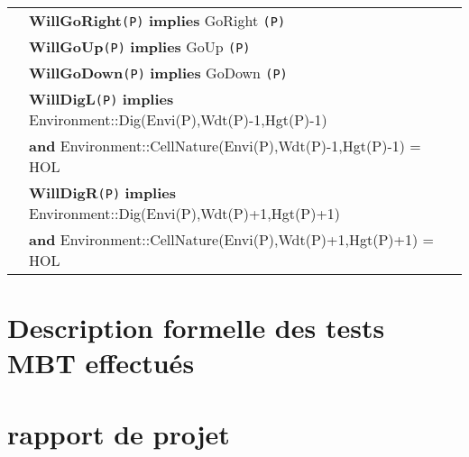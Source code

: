 \documentclass{article}
\begin{document}
\begin{tabular}{rl}
& \textbf{WillGoRight}\texttt{(P)}  \textbf{implies} \textrm{GoRight} \texttt{(P)}\\ 

& \textbf{WillGoUp}\texttt{(P)}  \textbf{implies} \textrm{GoUp} \texttt{(P)}\\ 

& \textbf{WillGoDown}\texttt{(P)}  \textbf{implies} \textrm{GoDown} \texttt{(P)}\\

& \textbf{WillDigL}\texttt{(P)} \textbf{implies}
\textrm{Environment::Dig(Envi(P),Wdt(P)-1,Hgt(P)-1)}\\
& \quad \textbf{and} \textrm{Environment::CellNature(Envi(P),Wdt(P)-1,Hgt(P)-1)} = \textrm{HOL} \\

& \textbf{WillDigR}\texttt{(P)} \textbf{implies} \textrm{Environment::Dig(Envi(P),Wdt(P)+1,Hgt(P)+1)}\\

& \quad \textbf{and} \textrm{Environment::CellNature(Envi(P),Wdt(P)+1,Hgt(P)+1)} = \textrm{HOL} \\

\end{tabular}



\section*{Description formelle des tests MBT effectués}

\section*{rapport de projet}
\end{document}

